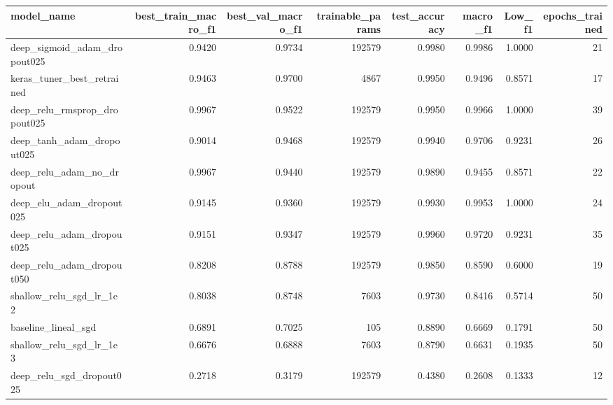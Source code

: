 \begin{tabular}{lrrrrrrr}
\toprule
model_name & best_train_macro_f1 & best_val_macro_f1 & trainable_params & test_accuracy & macro_f1 & Low_f1 & epochs_trained \\
\midrule
deep_sigmoid_adam_dropout025 & 0.9420 & 0.9734 & 192579 & 0.9980 & 0.9986 & 1.0000 & 21 \\
keras_tuner_best_retrained & 0.9463 & 0.9700 & 4867 & 0.9950 & 0.9496 & 0.8571 & 17 \\
deep_relu_rmsprop_dropout025 & 0.9967 & 0.9522 & 192579 & 0.9950 & 0.9966 & 1.0000 & 39 \\
deep_tanh_adam_dropout025 & 0.9014 & 0.9468 & 192579 & 0.9940 & 0.9706 & 0.9231 & 26 \\
deep_relu_adam_no_dropout & 0.9967 & 0.9440 & 192579 & 0.9890 & 0.9455 & 0.8571 & 22 \\
deep_elu_adam_dropout025 & 0.9145 & 0.9360 & 192579 & 0.9930 & 0.9953 & 1.0000 & 24 \\
deep_relu_adam_dropout025 & 0.9151 & 0.9347 & 192579 & 0.9960 & 0.9720 & 0.9231 & 35 \\
deep_relu_adam_dropout050 & 0.8208 & 0.8788 & 192579 & 0.9850 & 0.8590 & 0.6000 & 19 \\
shallow_relu_sgd_lr_1e2 & 0.8038 & 0.8748 & 7603 & 0.9730 & 0.8416 & 0.5714 & 50 \\
baseline_lineal_sgd & 0.6891 & 0.7025 & 105 & 0.8890 & 0.6669 & 0.1791 & 50 \\
shallow_relu_sgd_lr_1e3 & 0.6676 & 0.6888 & 7603 & 0.8790 & 0.6631 & 0.1935 & 50 \\
deep_relu_sgd_dropout025 & 0.2718 & 0.3179 & 192579 & 0.4380 & 0.2608 & 0.1333 & 12 \\
\bottomrule
\end{tabular}
